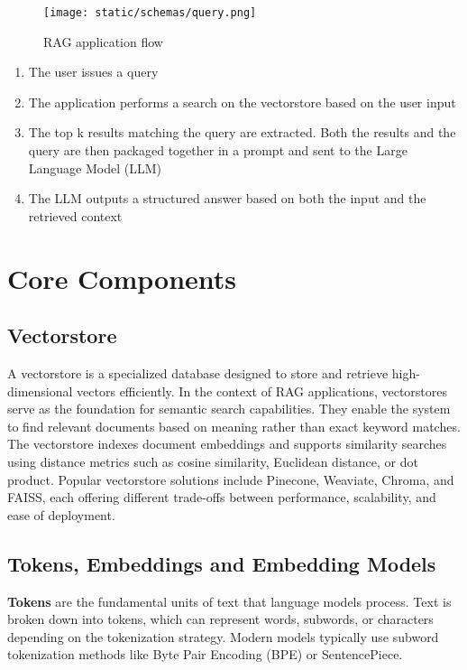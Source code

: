 \documentclass[11pt,a4paper]{report}
\begin{document}
\begin{figure}[H]
        \centering
        \texttt{[image: static/schemas/query.png]}
        \caption{RAG application flow}
        \label{fig:ragflow}
    \end{figure}

\begin{enumerate}
    \item The user issues a query
    \item The application performs a search on the vectorstore based on the user input
    \item The top k results matching the query are extracted. Both the results and the query are then packaged together in a prompt and sent to the Large Language Model (LLM)
    \item The LLM outputs a structured answer based on both the input and the retrieved context
\end{enumerate}

\section{Core Components}

\subsection{Vectorstore}
A vectorstore is a specialized database designed to store and retrieve high-dimensional vectors efficiently. In the context of RAG applications, vectorstores serve as the foundation for semantic search capabilities. They enable the system to find relevant documents based on meaning rather than exact keyword matches. The vectorstore indexes document embeddings and supports similarity searches using distance metrics such as cosine similarity, Euclidean distance, or dot product. Popular vectorstore solutions include Pinecone, Weaviate, Chroma, and FAISS, each offering different trade-offs between performance, scalability, and ease of deployment.

\subsection{Tokens, Embeddings and Embedding Models}
\textbf{Tokens} are the fundamental units of text that language models process. Text is broken down into tokens, which can represent words, subwords, or characters depending on the tokenization strategy. Modern models typically use subword tokenization methods like Byte Pair Encoding (BPE) or SentencePiece.
\end{document}
